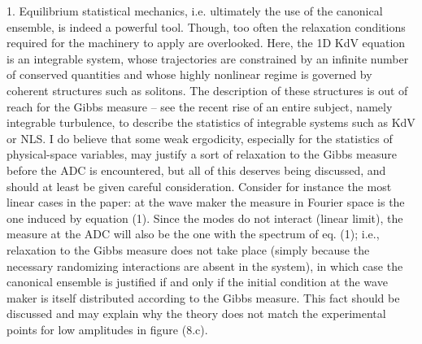 \documentclass[11pt]{article}
\newcommand{\comment}[1]{{\color{blue} #1}}
\begin{document}
\noindent
\comment{
1. Equilibrium statistical mechanics, i.e. ultimately the use of the canonical ensemble, is indeed a powerful tool. Though, too often the relaxation conditions required for the machinery to apply are overlooked. Here, the 1D KdV equation is an integrable system, whose trajectories are constrained by an infinite number of conserved quantities and whose highly nonlinear regime is governed by coherent structures such as solitons. The description of these structures is out of reach for the Gibbs measure – see the recent rise of an entire subject, namely integrable turbulence, to describe the statistics of integrable systems such as KdV or NLS. I do believe that some weak ergodicity, especially for the statistics of physical-space variables, may justify a sort of relaxation to the Gibbs measure before the ADC is encountered, but all of this deserves being discussed, and should at least be given careful consideration. Consider for instance the most linear cases in the paper: at the wave maker the measure in Fourier space is the one induced by equation (1). Since the modes do not interact (linear limit), the measure at the ADC will also be the one with the spectrum of eq. (1); i.e., relaxation to the Gibbs measure does not take place (simply because the necessary randomizing interactions are absent in the system), in which case the canonical ensemble is justified if and only if the initial condition at the wave maker is itself distributed according to the Gibbs measure. This fact should be discussed and may explain why the theory does not match the experimental points for low amplitudes in figure (8.c).}
\end{document}
